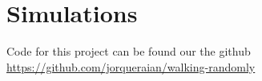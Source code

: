 \documentclass[%
 reprint,
 amsmath,amssymb,
 aps,
]{revtex4-2}
\begin{document}
\appendix

\section{Simulations}

Code for this project can be found our the github \href{https://github.com/jorqueraian/walking-randomly}{https://github.com/jorqueraian/walking-randomly}


\end{document}
